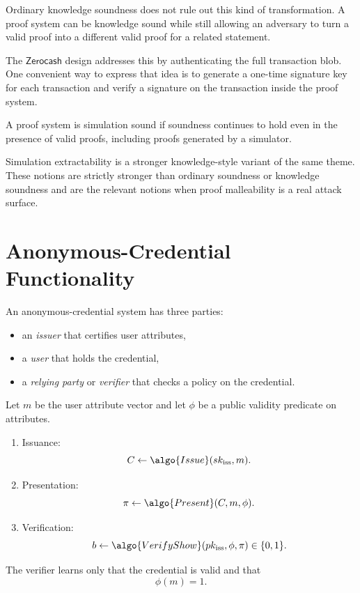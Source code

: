 \documentclass[11pt]{article}
\newcommand{\Issue}{\algo{Issue}}
\newcommand{\Present}{\algo{Present}}
\newcommand{\VerifyShow}{\algo{VerifyShow}}
\newcommand{\Zerocash}{\ensuremath{\mathsf{Zerocash}}}
\begin{document}
\begin{remark}
Ordinary knowledge soundness does not rule out this kind of transformation.  A
proof system can be knowledge sound while still allowing an adversary to turn a
valid proof into a different valid proof for a related statement.
\end{remark}

The \Zerocash{} design addresses this by authenticating the full transaction
blob.  One convenient way to express that idea is to generate a one-time
signature key for each transaction and verify a signature on the transaction
inside the proof system.

\begin{definition}
A proof system is simulation sound if soundness continues to hold even in the
presence of valid proofs, including proofs generated by a simulator.
\end{definition}

\begin{remark}
Simulation extractability is a stronger knowledge-style variant of the same
theme.  These notions are strictly stronger than ordinary soundness or
knowledge soundness and are the relevant notions when proof malleability is a
real attack surface.
\end{remark}

\section{Anonymous-Credential Functionality}

An anonymous-credential system has three parties:
\begin{itemize}
  \item an \emph{issuer} that certifies user attributes,
  \item a \emph{user} that holds the credential,
  \item a \emph{relying party} or \emph{verifier} that checks a policy on the
        credential.
\end{itemize}

\begin{highlight}[title={Anonymous-Credential Interface}]
Let $m$ be the user attribute vector and let $\phi$ be a public validity
predicate on attributes.
\begin{enumerate}
  \item Issuance:
        \[
          C \leftarrow \Issue(sk_{\mathrm{iss}}, m).
        \]
  \item Presentation:
        \[
          \pi \leftarrow \Present(C, m, \phi).
        \]
  \item Verification:
        \[
          b \leftarrow \VerifyShow(pk_{\mathrm{iss}}, \phi, \pi) \in \{0,1\}.
        \]
\end{enumerate}
The verifier learns only that the credential is valid and that
\[
  \phi(m)=1.
\]
\end{highlight}
\end{document}
